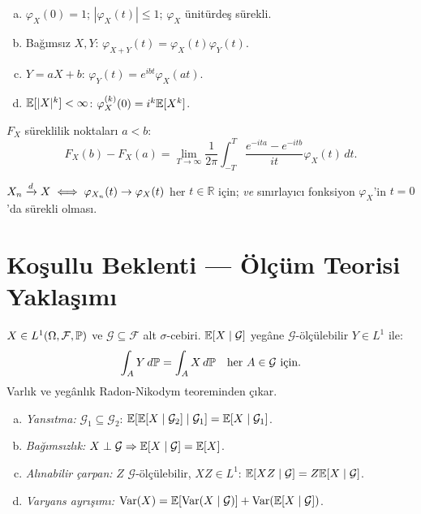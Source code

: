 \begin{teorem}[KF özellikleri]\label{app:thm:kf_ozell}
\begin{enumerate}[(a)]
  \item $\varphi_X(0)=1$; $|\varphi_X(t)|\leq1$; $\varphi_X$ ünitürdeş sürekli.
  \item Bağımsız $X,Y$: $\varphi_{X+Y}(t)=\varphi_X(t)\varphi_Y(t)$.
  \item $Y=aX+b$: $\varphi_Y(t)=e^{ibt}\varphi_X(at)$.
  \item $\mathbb{E}[|X|^k]<\infty$: $\varphi_X^{(k)}(0)=i^k\mathbb{E}[X^k]$.
\end{enumerate}
\end{teorem}

\begin{teorem}\label{app:thm:tersim}
$F_X$ süreklilik noktaları $a<b$:
\[
  F_X(b)-F_X(a) = \lim_{T\to\infty}\frac{1}{2\pi}\int_{-T}^T\frac{e^{-ita}-e^{-itb}}{it}\varphi_X(t)\,dt.
\]
\end{teorem}

\begin{teorem}\label{app:thm:levy_sureklilk}
$X_n\xrightarrow{d} X \iff \varphi_{X_n}(t)\to\varphi_X(t)$ her $t\in\mathbb{R}$ için; \textit{ve} sınırlayıcı fonksiyon $\varphi_X$'in $t=0$'da sürekli olması.
\end{teorem}

\section{Koşullu Beklenti --- Ölçüm Teorisi Yaklaşımı}
\label{app:kosullu_beklenti}

\begin{tanim}\label{app:def:kosullu_beklenti}
$X\in L^1(\Omega,\mathcal{F},\mathbb{P})$ ve $\mathcal{G}\subseteq\mathcal{F}$ alt $\sigma$-cebiri. $\mathbb{E}[X\mid\mathcal{G}]$ yegâne $\mathcal{G}$-ölçülebilir $Y\in L^1$ ile:
\[
  \int_A Y\,d\mathbb{P} = \int_A X\,d\mathbb{P} \quad \text{her } A\in\mathcal{G} \text{ için.}
\]
Varlık ve yegânlık Radon-Nikodym teoreminden çıkar.
\end{tanim}

\begin{teorem}\label{app:thm:kb_ozell}
\begin{enumerate}[(a)]
  \item \emph{Yansıtma:} $\mathcal{G}_1\subseteq\mathcal{G}_2$: $\mathbb{E}[\mathbb{E}[X\mid\mathcal{G}_2]\mid\mathcal{G}_1]=\mathbb{E}[X\mid\mathcal{G}_1]$.
  \item \emph{Bağımsızlık:} $X\perp\mathcal{G}\Rightarrow\mathbb{E}[X\mid\mathcal{G}]=\mathbb{E}[X]$.
  \item \emph{Alınabilir çarpan:} $Z$ $\mathcal{G}$-ölçülebilir, $XZ\in L^1$: $\mathbb{E}[XZ\mid\mathcal{G}]=Z\mathbb{E}[X\mid\mathcal{G}]$.
  \item \emph{Varyans ayrışımı:} $\operatorname{Var}(X)=\mathbb{E}[\operatorname{Var}(X\mid\mathcal{G})]+\operatorname{Var}(\mathbb{E}[X\mid\mathcal{G}])$.
\end{enumerate}
\end{teorem}

